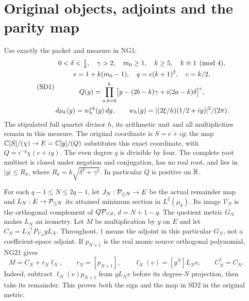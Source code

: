 \documentclass[11pt]{article}
\begin{document}
\section{Original objects, adjoints and the parity map}
Use exactly the packet and measure in NG1:
\begin{equation}\tag{SD1}
\begin{gathered}
0<\delta<\tfrac12,\quad\gamma>2,\quad m_0\ge1,\quad
k\ge5,\quad k\equiv1\pmod4,\\
e=1+k(m_0-1),\quad q=e(k+1)^2,\quad c=k/2,\\
Q(y)=\prod_{a,b=0}^k
\bigl[y-(2b-k)\gamma+i(2a-k)\delta\bigr]^e,\\
\,d\mu_k(y)=w_h^{*k}(y)\,d y,\qquad
w_h(y)=|(2\xi/h)(1/2+iy)|^2/(2\pi).
\end{gathered}
\end{equation}
The stipulated full quartet divisor $h$, its arithmetic unit and all
multiplicities remain in this measure. The original coordinate is
$S=c+iy$; the map $\mathbb C[S]/(\chi)\to E=\mathbb C[y]/(Q)$ substitutes this exact
coordinate, with $Q=i^{-q}\chi(c+iy)$. The even degree $q$ is divisible
by four. The complete root multiset is closed under negation and
conjugation, has no real root, and lies in $|y|\le R_k$, where
$R_k=k\sqrt{\delta^2+\gamma^2}$. In particular $Q$ is positive on $\mathbb R$.

For each $q-1\le N\le2q-1$, let $J_N:\mathcal P_{\le N}\to E$ be the
actual remainder map and $L_N:E\to\mathcal P_{\le N}$ its attained minimum
section in $L^2(\mu_k)$. Its image $\mathcal V_N$ is the orthogonal
complement of $Q\mathcal P_{<d}$, $d=N+1-q$. The quotient metric $G_N$ makes
$L_N$ an isometry. Let $M$ be multiplication by $y$ on $E$ and let
$C_N=L_N^{-1}P_{\mathcal V_N}yL_N$. Throughout, $\dagger$ means the
adjoint in this particular $G_N$, not a coefficient-space adjoint.
If $p_{N+1}$ is the real monic source orthogonal polynomial, NG21 gives
\begin{equation}\tag{SD2}
M=C_N+r_N\ell_N,\qquad r_N=[p_{N+1}],\qquad
\ell_N(v)=[y^N]L_Nv,\qquad C_N^\dagger=C_N.
\end{equation}
Indeed, subtract $\ell_N(v)p_{N+1}$ from $yL_Nv$ before its degree-$N$
projection, then take its remainder. This proves both the sign and the
map in SD2 in the original metric.
\end{document}
